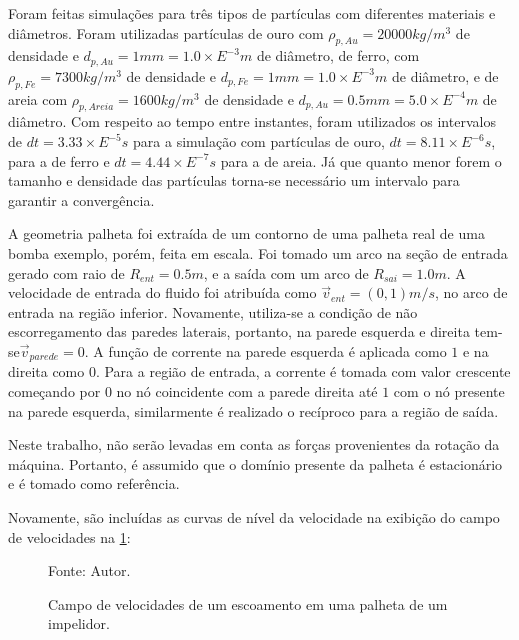 Foram feitas simulações para três tipos de partículas com diferentes materiais e diâmetros.
Foram utilizadas partículas de ouro com $\rho_{p,Au}=20000kg/m^3$ de densidade e $d_{p,Au}=1mm=1.0\times E^{-3}m$ de diâmetro, de ferro, com $\rho_{p,Fe}=7300kg/m^3$ de densidade e $d_{p,Fe}=1mm=1.0\times E^{-3}m$ de diâmetro, e de areia com $\rho_{p,Areia}=1600kg/m^3$ de densidade e $d_{p,Au}=0.5mm=5.0\times E^{-4}m$ de diâmetro.
Com respeito ao tempo entre instantes, foram utilizados os intervalos de $dt=3.33\times E^{-5}s$ para a simulação com partículas de ouro, $dt=8.11\times E^{-6}s$, para a de ferro e $dt=4.44\times E^{-7}s$ para a de areia.
Já que quanto menor forem o tamanho e densidade das partículas torna-se necessário um intervalo para garantir a convergência.

A geometria palheta foi extraída de um contorno de uma palheta real de uma bomba exemplo, porém, feita em escala.
Foi tomado um arco na seção de entrada gerado com raio de $R_{ent}=0.5m$, e a saída com um arco de $R_{sai}=1.0m$.
A velocidade de entrada do fluido foi atribuída como $\vec{v}_{ent}=(0, 1)m/s$, no arco de entrada na região inferior.
Novamente, utiliza-se a condição de não escorregamento das paredes laterais, portanto, na parede esquerda e direita tem-se$\vec{v}_{parede}=0$.
A função de corrente na parede esquerda é aplicada como $1$ e na direita como $0$.
Para a região de entrada, a corrente é tomada com valor crescente começando por $0$ no nó coincidente com a parede direita até $1$ com o nó presente na parede esquerda, similarmente é realizado o recíproco para a região de saída.

Neste trabalho, não serão levadas em conta as forças provenientes da rotação da máquina.
Portanto, é assumido que o domínio presente da palheta é estacionário e é tomado como referência.

Novamente, são incluídas as curvas de nível da velocidade na exibição do campo de velocidades na \ref{rotor_result}:
\begin{figure}[H]
    \centering
     {\raggedleft \scriptsize Fonte: Autor.}
    \caption{Campo de velocidades de um escoamento em uma palheta de um impelidor.}
    \label{rotor_result}
\end{figure}

